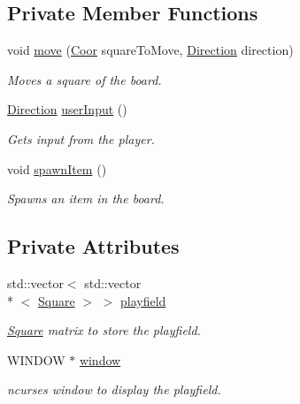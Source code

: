 \subsection*{Private Member Functions}
\begin{DoxyCompactItemize}
\item 
void \hyperlink{class_board_acdad6d3fae5aa18a823d6618fdebbd16}{move} (\hyperlink{common_8hpp_af5a69199868671fc85779715443d7e7d}{Coor} square\-To\-Move, \hyperlink{common_8hpp_afffcc922842a32b41fc33e317e67c474}{Direction} direction)
\begin{DoxyCompactList}\small\item\em Moves a square of the board. \end{DoxyCompactList}\item 
\hyperlink{common_8hpp_afffcc922842a32b41fc33e317e67c474}{Direction} \hyperlink{class_board_aa00d012f8c2abdb3d599ce694df5ba4f}{user\-Input} ()
\begin{DoxyCompactList}\small\item\em Gets input from the player. \end{DoxyCompactList}\item 
void \hyperlink{class_board_a4252fbb5f307ae562c76fb1d28636958}{spawn\-Item} ()
\begin{DoxyCompactList}\small\item\em Spawns an item in the board. \end{DoxyCompactList}\end{DoxyCompactItemize}
\subsection*{Private Attributes}
\begin{DoxyCompactItemize}
\item 
\hypertarget{class_board_abbfc50e8d22248d90499683266414786}{std\-::vector$<$ std\-::vector\\*
$<$ \hyperlink{class_square}{Square} $>$ $>$ \hyperlink{class_board_abbfc50e8d22248d90499683266414786}{playfield}}\label{class_board_abbfc50e8d22248d90499683266414786}

\begin{DoxyCompactList}\small\item\em \hyperlink{class_square}{Square} matrix to store the playfield. \end{DoxyCompactList}\item 
\hypertarget{class_board_a39603507e84a1c2cc03b6d1ac1a530d1}{W\-I\-N\-D\-O\-W $\ast$ \hyperlink{class_board_a39603507e84a1c2cc03b6d1ac1a530d1}{window}}\label{class_board_a39603507e84a1c2cc03b6d1ac1a530d1}

\begin{DoxyCompactList}\small\item\em ncurses window to display the playfield. \end{DoxyCompactList}\end{DoxyCompactItemize}


